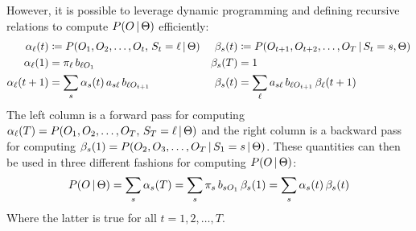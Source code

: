 			However, it is possible to leverage dynamic programming and defining recursive relations to compute \( P(O \,\vert\, \Theta) \) efficiently:
			\begin{align}
				\alpha_\ell(t)     & \coloneqq P(O_1, O_2, \dots, O_t,\, S_t = \ell \,\vert\, \Theta) & \beta_s(t) & \coloneqq P(O_{t + 1}, O_{t + 2}, \dots, O_T \,\vert\, S_t = s, \Theta) \\
				\alpha_\ell(1)     & = \pi_\ell \, b_{\ell O_1}                                    & \beta_s(T) & = 1                                                                  \\
				\alpha_\ell(t + 1) & = \sum_s \alpha_s(t) \, a_{s \ell} \, b_{\ell O_{t + 1}}      & \beta_s(t) & = \sum_\ell a_{s \ell} \, b_{\ell O_{t + 1}} \, \beta_\ell(t + 1)
			\end{align}
			The left column is a forward pass for computing \( \alpha_\ell(T) = P(O_1, O_2, \dots, O_T,\, S_T = \ell \,\vert\, \Theta) \) and the right column is a backward pass for computing \( \beta_s(1) = P(O_2, O_3, \dots, O_T \,\vert\, S_1 = s \,\vert\, \Theta) \). These quantities can then be used in three different fashions for computing \( P(O \,\vert\, \Theta) \):
			\begin{equation}
				P(O \,\vert\, \Theta)
					= \sum_s \alpha_s(T)
					= \sum_s \pi_s \, b_{s O_1} \, \beta_s(1)
					= \sum_s \alpha_s(t) \, \beta_s(t)
			\end{equation}
			Where the latter is true for all \( t = 1, 2, \dots, T \).

